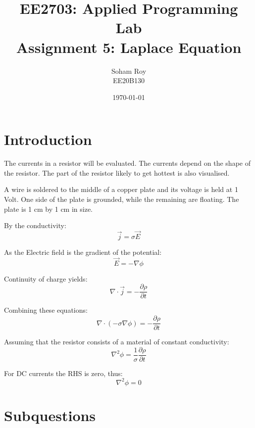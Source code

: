 \documentclass[12pt, a4paper]{article}
\title{EE2703: Applied Programming Lab \\ \Large Assignment 5: Laplace Equation}
\author{Soham Roy \\ \normalsize EE20B130}
\date{\today}
\begin{document}
\maketitle %


\bigskip
\section{Introduction}
The currents in a resistor will be evaluated. The currents depend on the shape of the resistor.
The part of the resistor likely to get hottest is also visualised. \\
\medskip

A wire is soldered to the middle of a copper plate and its voltage is held at 1 Volt. One side of the plate is
grounded, while the remaining are floating. The plate is 1 cm by 1 cm in size.

By the conductivity:
\begin{equation*}
    \vec{j} = \sigma \vec{E}
\end{equation*}

As the Electric field is the gradient of the potential:
\begin{equation*}
    \vec{E} = - \nabla \phi
\end{equation*}

Continuity of charge yields:
\begin{equation*}
    \nabla \cdot \vec{j} = - \frac{\partial \rho}{\partial t}
\end{equation*}

Combining these equations:
\begin{equation*}
    \nabla \cdot (- \sigma \nabla \phi) = - \frac{\partial \rho}{\partial t}
\end{equation*}

Assuming that the resistor consists of a material of constant conductivity:
\begin{equation*}
    \nabla^2 \phi = \frac{1}{\sigma} \frac{\partial \rho}{\partial t}
\end{equation*}

For DC currents the RHS is zero, thus:
\begin{equation*}
    \nabla^2 \phi = 0
\end{equation*}



\section{Subquestions}
\end{document}
